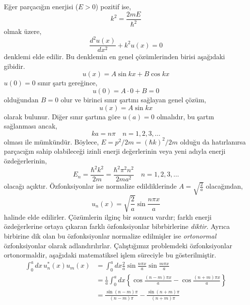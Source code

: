 \documentclass[a4paper,12pt, twoside]{article}
\begin{document}
Eğer parçacığın enerjisi ($E>0$) pozitif ise,
\begin{equation}
k ^ { 2 } = \frac { 2 m E } { \hbar ^ { 2 } }
\end{equation}
olmak üzere,
\begin{equation}
\frac { d ^ { 2 } u ( x ) } { d x ^ { 2 } } + k ^ { 2 } u ( x ) = 0
\end{equation}
denklemi elde edilir. Bu denklemin en genel çözümlerinden birisi aşağıdaki gibidir.
\begin{equation}
u(x) = A \sin k x + B \cos k x
\end{equation}
$u(0)=0$ sınır şartı gereğince,
\begin{equation*}
u(0) = A\cdot 0 + B = 0
\end{equation*}
olduğundan $B=0$ olur ve birinci sınır şartını sağlayan genel çözüm,
\begin{equation}
u(x) = A \sin k x
\end{equation}
olarak bulunur. Diğer sınır şartına göre $u(a)=0$ olmalıdır, bu şartın sağlanması ancak,
\begin{equation}
k a = n \pi \quad n = 1,2,3 , \ldots
\end{equation}
olması ile mümkündür. Böylece, $E = p^2/2m = (\hbar k)^2/2m$ olduğu da hatırlanırsa parçacığın sahip olabileceği izinli enerji değerlerinin veya yeni adıyla enerji özdeğerlerinin,
\begin{equation}
E _ { n } = \frac { \hbar ^ { 2 } k ^ { 2 } } { 2 m } = \frac { \hbar ^ { 2 } \pi ^ { 2 } n ^ { 2 } } { 2 m a ^ { 2 } } \quad n = 1,2,3 , \ldots
\end{equation}
olacağı açıktır. Özfonksiyonlar ise normalize edildiklerinde $A=\sqrt { \frac { 2 } { a } }$ olacağından,
\begin{equation}
u _ { n } ( x ) = \sqrt { \frac { 2 } { a } } \sin \frac { n \pi x } { a }
\end{equation}
halinde elde edilirler. Çözümlerin ilginç bir sonucu vardır; farklı enerji özdeğerlerine ortaya çıkaran farklı özfonksiyonlar bibrbirlerine \emph{diktir}. Ayrıca birbirine dik olan bu özfonksiyonlar normalize edilmişler ise \emph{ortonormal} özfonksiyonlar olarak adlandırılırlar. Çalıştığımız problemdeki özfonksiyonlar ortonormaldir, aşağıdaki matematiksel işlem süreciyle bu gösterilmiştir.
\begin{align} 
	\int _ { 0 } ^ { a } d x \, u _ { n } ^ { * } ( x ) u _ { m } ( x ) 
	& = \int _ { 0 } ^ { a } d x \frac { 2 } { a } \sin \frac { n \pi x } { a } \sin \frac { m \pi x } { a } \nonumber\\ 
	& = \frac { 1 } { a } \int _ { 0 } ^ { a } d x \left\{ \cos \frac { ( n - m ) \pi x } { a } - \cos \frac { ( n + m ) \pi x } { a } \right\} \nonumber\\ 
	& = \frac { \sin ( n - m ) \pi } { ( n - m ) \pi } - \frac { \sin ( n + m ) \pi } { ( n + m ) \pi }
\end{align}
\end{document}
